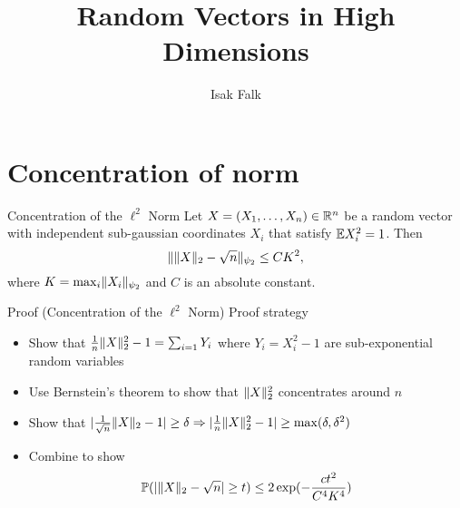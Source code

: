 \documentclass{beamer}
\title{Random Vectors in High Dimensions}
\author{Isak Falk}
\institute{IIT}
\begin{document}
  \maketitle
  \section{Concentration of norm}
  \begin{frame}{Concentration of the \(\ell^{2}\) Norm}
      Let \(X = (X_{1}, \dots, X_{n}) \in \mathbb{R}^{n}\) be a random vector with independent
      sub-gaussian coordinates \(X_{i}\) that satisfy \(\mathbb{E} X_{i}^{2} = 1\). Then
      \begin{equation}
        \lVert\lVert X\rVert_{2} - \sqrt{n}\rVert_{\psi_{2}} \leq CK^{2},
      \end{equation}
      where \(K = \max_{i} \lVert X_{i}\rVert_{\psi_{2}}\) and \(C\) is an absolute
      constant.
  \end{frame}

  \begin{frame}{Proof (Concentration of the \(\ell^{2}\) Norm)}
    Proof strategy\pause
    \begin{itemize}
      \item Show that \(\frac{1}{n}\lVert X\rVert_{2}^{2} - 1 = \sum_{i=1}Y_{i} \)
        where \(Y_{i} = X_{i}^{2} - 1\) are sub-exponential random variables\pause
      \item Use Bernstein's theorem to show that \(\lVert X\rVert_{2}^{2}\)
        concentrates around \(n\)\pause
      \item Show that
        \(\lvert\frac{1}{\sqrt{n}}\lVert X\rVert_{2} - 1\rvert \geq \delta \Rightarrow \lvert\frac{1}{n}\lVert X\rVert_{2}^{2} - 1\rvert \geq \max(\delta, \delta^{2})\)\pause
      \item Combine to show
        \begin{equation}
          \mathbb{P}(\lvert\lVert X\rVert_{2} - \sqrt{n}\rvert \geq t) \leq 2 \exp(-\frac{ct^{2}}{C^{4}K^{4}})
        \end{equation}
    \end{itemize}
  \end{frame}
\end{document}
